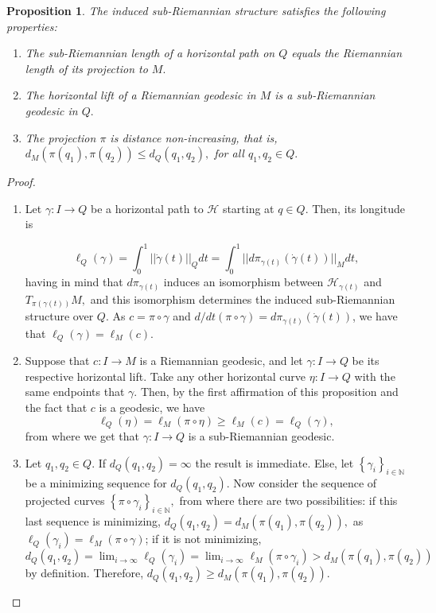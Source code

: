 \documentclass[12pt, letterpaper, reqno]{amsart}
\theoremstyle{definition}
\theoremstyle{plain}
\newtheorem{prop}{Proposition}
\theoremstyle{remark}
\begin{document}
\begin{prop}
	The induced sub-Riemannian structure satisfies the following properties:
	\begin{enumerate}
		\item The sub-Riemannian length of a horizontal path on $ Q $ equals the Riemannian length of its projection to $ M. $ 
		\item The horizontal lift of a Riemannian geodesic in $ M $ is a sub-Riemannian geodesic in $ Q. $ 
		\item The projection $ \pi $ is distance non-increasing, that is, $ d_M(\pi(q_1), \pi(q_2))\leq d_Q(q_1,q_2), $ for all $ q_1,q_2\in Q. $ 
	\end{enumerate}
\end{prop}
\begin{proof}
	\begin{enumerate}
		\item Let $ \gamma: I \rightarrow {Q} $ be a horizontal path to $ \mathcal{H} $ starting at $ q\in Q. $ Then, its longitude is 

		$$\ell_Q(\gamma) = \int_0^1 ||\dot{\gamma} (t) ||_{Q} dt = \int_0^1 || d\pi_{\gamma(t)}(\dot{\gamma}(t))||_M dt,$$ 
		having in mind that $d\pi_{\gamma(t)}$ induces an isomorphism between $ \mathcal{H}_{\gamma(t)} $ and $ T_{\pi(\gamma(t))} M,$ and this isomorphism determines the induced sub-Riemannian structure over $ Q. $ As $c=\pi\circ\gamma$ and $ d/dt(\pi\circ\gamma) = d\pi_{\gamma(t)}(\dot{\gamma}(t)) $, we have that $ \ell_Q(\gamma)=\ell_M(c). $  

		\item Suppose that $ c: I \rightarrow {M} $ is a Riemannian geodesic, and let $ \gamma: I \rightarrow {Q} $ be its respective horizontal lift. Take any other horizontal curve $ \eta: I \rightarrow {Q} $ with the same endpoints that $ \gamma. $ Then, by the first affirmation of this proposition and the fact that $ c $ is a geodesic, we have
			$$ \ell_Q(\eta) = \ell_M(\pi\circ \eta) \geq \ell_M(c) = \ell_Q(\gamma),  $$ 
		from where we get that $ \gamma: I \rightarrow {Q} $ is a sub-Riemannian geodesic.

	\item Let $ q_1,q_2\in Q. $ If $ d_Q(q_1,q_2) = \infty $ the result is immediate. Else, let $ \left\{ \gamma_i \right\}_{i\in \mathbb{N}} $ be a minimizing sequence for $ d_Q(q_1,q_2). $ Now consider the sequence of projected curves $ \left\{ \pi\circ\gamma_i \right\}_{i\in \mathbb{N}}, $ from where there are two possibilities: if this last sequence is minimizing, $ d_Q(q_1, q_2) = d_M(\pi(q_1), \pi(q_2)),$ as $ \ell_Q(\gamma_i)=\ell_M(\pi\circ\gamma) $;  if it is not minimizing,  $d_Q(q_1,q_2) = \lim_{i \rightarrow \infty} \ell_Q(\gamma_i) = \lim_{i \rightarrow \infty} \ell_M(\pi\circ\gamma_i) > d_M(\pi(q_1),\pi(q_2))$ by definition. Therefore, $ d_Q(q_1,q_2)\geq d_M(\pi(q_1),\pi(q_2)).$
	\end{enumerate}
\end{proof}
\end{document}

